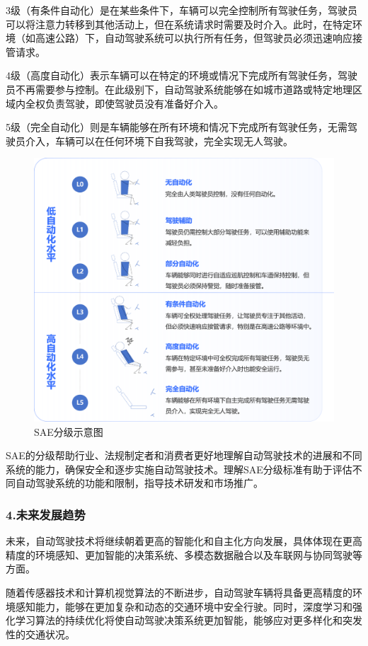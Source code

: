 3级（有条件自动化）是在某些条件下，车辆可以完全控制所有驾驶任务，驾驶员可以将注意力转移到其他活动上，但在系统请求时需要及时介入。此时，在特定环境（如高速公路）下，自动驾驶系统可以执行所有任务，但驾驶员必须迅速响应接管请求。

4级（高度自动化）表示车辆可以在特定的环境或情况下完成所有驾驶任务，驾驶员不再需要参与控制。在此级别下，自动驾驶系统能够在如城市道路或特定地理区域内全权负责驾驶，即使驾驶员没有准备好介入。

5级（完全自动化）则是车辆能够在所有环境和情况下完成所有驾驶任务，无需驾驶员介入，车辆可以在任何环境下自我驾驶，完全实现无人驾驶。

\begin{figure}[ht]
  \centering
  \includegraphics[width=0.95\linewidth]{image/4/自动驾驶等级.png}
  \caption{SAE分级示意图}
  \label{fig:SAE分级}
\end{figure}

SAE的分级帮助行业、法规制定者和消费者更好地理解自动驾驶技术的进展和不同系统的能力，确保安全和逐步实施自动驾驶技术。理解SAE分级标准有助于评估不同自动驾驶系统的功能和限制，指导技术研发和市场推广。

\subsubsection{4.未来发展趋势}
未来，自动驾驶技术将继续朝着更高的智能化和自主化方向发展，具体体现在更高精度的环境感知、更加智能的决策系统、多模态数据融合以及车联网与协同驾驶等方面。

随着传感器技术和计算机视觉算法的不断进步，自动驾驶车辆将具备更高精度的环境感知能力，能够在更加复杂和动态的交通环境中安全行驶。同时，深度学习和强化学习算法的持续优化将使自动驾驶决策系统更加智能，能够应对更多样化和突发性的交通状况。

